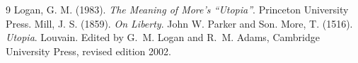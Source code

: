 \documentclass{situationist-preprint}
\begin{document}
\begin{thebibliography}{9}\small
{} Logan, G. M. (1983). \emph{The Meaning of More's \enquote{Utopia}}. Princeton University Press.
 Mill, J. S. (1859). \emph{On Liberty}. John W. Parker and Son.
 More, T. (1516). \emph{Utopia}. Louvain. Edited by G.~M. Logan and R.~M. Adams, Cambridge University Press, revised edition 2002.
\end{thebibliography}
\end{document}
